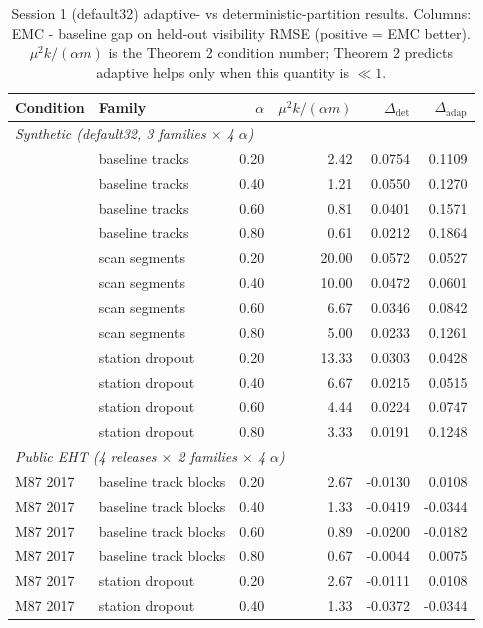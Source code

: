\begin{table}[t]
\centering
\caption{Session 1 (default32) adaptive- vs deterministic-partition results. Columns: EMC - baseline gap on held-out visibility RMSE (positive = EMC better). $\mu^2 k / (\alpha m)$ is the Theorem 2 condition number; Theorem 2 predicts adaptive helps only when this quantity is $\ll 1$.}
\label{tab:adaptive_partition_results}
\small
\begin{tabular}{llrrrr}
\hline
Condition & Family & $\alpha$ & $\mu^2 k/(\alpha m)$ & $\Delta_{\text{det}}$ & $\Delta_{\text{adap}}$ \\
\hline
\multicolumn{6}{l}{\textit{Synthetic (default32, 3 families $\times$ 4 $\alpha$)}} \\
  & baseline tracks & 0.20 & 2.42 & 0.0754 & 0.1109 \\
  & baseline tracks & 0.40 & 1.21 & 0.0550 & 0.1270 \\
  & baseline tracks & 0.60 & 0.81 & 0.0401 & 0.1571 \\
  & baseline tracks & 0.80 & 0.61 & 0.0212 & 0.1864 \\
  & scan segments & 0.20 & 20.00 & 0.0572 & 0.0527 \\
  & scan segments & 0.40 & 10.00 & 0.0472 & 0.0601 \\
  & scan segments & 0.60 & 6.67 & 0.0346 & 0.0842 \\
  & scan segments & 0.80 & 5.00 & 0.0233 & 0.1261 \\
  & station dropout & 0.20 & 13.33 & 0.0303 & 0.0428 \\
  & station dropout & 0.40 & 6.67 & 0.0215 & 0.0515 \\
  & station dropout & 0.60 & 4.44 & 0.0224 & 0.0747 \\
  & station dropout & 0.80 & 3.33 & 0.0191 & 0.1248 \\
\hline
\multicolumn{6}{l}{\textit{Public EHT (4 releases $\times$ 2 families $\times$ 4 $\alpha$)}} \\
M87 2017 & baseline track blocks & 0.20 & 2.67 & -0.0130 & 0.0108 \\
M87 2017 & baseline track blocks & 0.40 & 1.33 & -0.0419 & -0.0344 \\
M87 2017 & baseline track blocks & 0.60 & 0.89 & -0.0200 & -0.0182 \\
M87 2017 & baseline track blocks & 0.80 & 0.67 & -0.0044 & 0.0075 \\
M87 2017 & station dropout & 0.20 & 2.67 & -0.0111 & 0.0108 \\
M87 2017 & station dropout & 0.40 & 1.33 & -0.0372 & -0.0344 \\

\end{tabular}
\end{table}

